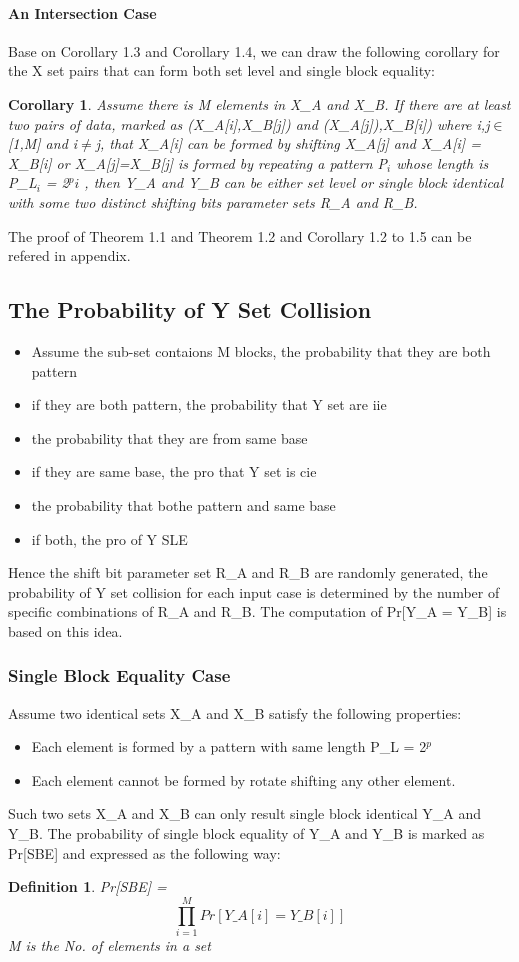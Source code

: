 \documentclass{article}
\newtheorem{corollary}[theorem]{Corollary}
\newtheorem{defination}{Definition}[section]
\begin{document}
\paragraph{An Intersection Case}
Base on Corollary 1.3 and Corollary 1.4, we can draw the following corollary for the X set pairs that can form both set level and single block equality:
\begin{corollary}
Assume there is M elements in X\_A and X\_B. If there are at least two pairs of data, marked as (X\_A[i],X\_B[j]) and (X\_A[j]),X\_B[i]) where i,j$\in$[1,M] and i$\neq$j, that X\_A[i] can be formed by shifting X\_A[j] and X\_A[i] = X\_B[i] or X\_A[j]=X\_B[j] is formed by repeating a pattern P$_i$ whose length is P\_L$_i$ = 2$^pi$ , then Y\_A and Y\_B can be either set level or single block identical with some two distinct shifting bits parameter sets R\_A and R\_B.
\end{corollary}
The proof of Theorem 1.1 and Theorem 1.2 and Corollary 1.2 to 1.5 can be refered in appendix.


\subsection{The Probability of Y Set Collision} 
\begin{itemize}
	\item Assume the sub-set contaions M blocks, the probability that they are both pattern 
	\item if they are both pattern, the probability that Y set are iie
	\item the probability that they are from same base
	\item if they are same base, the pro that Y set is cie
	\item the probability that bothe pattern and same base
	\item if both, the pro of Y SLE
\end{itemize}
Hence the shift bit parameter set R\_A and R\_B are randomly generated, the probability of Y set collision for each input case is determined by the number of specific combinations of R\_A and R\_B. The computation of Pr[Y\_A = Y\_B] is based on this idea.

\subsubsection{Single Block Equality Case}
Assume two identical sets X\_A and X\_B satisfy the following properties:
\begin{itemize}
	\item Each element is formed by a pattern with same length P\_L = 2$^p$
	\item Each element cannot be formed by rotate shifting any other element.
\end{itemize}
Such two sets X\_A and X\_B can only result single block identical Y\_A and Y\_B.
The probability of single block equality of Y\_A and Y\_B is marked as Pr[SBE] and expressed as the following way:
\begin{defination}
Pr[SBE] = $$\prod_{i=1}^M Pr[Y\_A[i] = Y\_B[i]]$$ M is the No. of elements in a set
\end{defination} 
\end{document}
